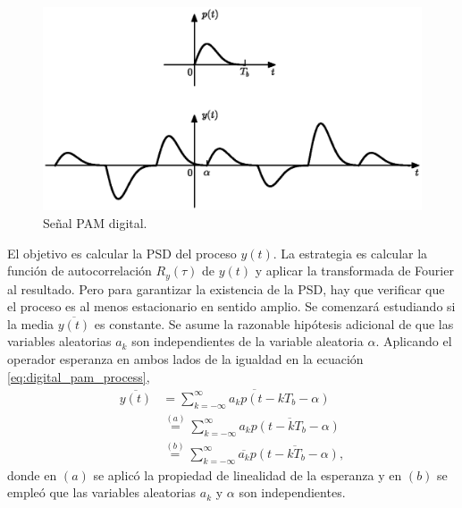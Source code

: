\documentclass[a4paper]{article}
\begin{document}
\begin{figure}[!htb]
\begin{center}
\includegraphics[width=0.9\columnwidth]{figuras/digital_pam.eps}
\caption{\label{fig:digital_pam} Señal PAM digital.}
\end{center}
\end{figure}

El objetivo es calcular la PSD  del proceso \(y(t)\). La estrategia es calcular la función de autocorrelación \(R_y(\tau)\) de \(y(t)\) y aplicar la transformada de Fourier al resultado. Pero para  garantizar la existencia de la PSD, hay que verificar que el proceso es al menos estacionario en sentido amplio. Se comenzará estudiando si la media \(\overline{y(t)}\) es constante. Se asume la razonable hipótesis adicional de que las variables aleatorias \(a_k\) son independientes de la variable aleatoria \(\alpha\). Aplicando el operador esperanza en ambos lados de la igualdad en la ecuación \ref{eq:digital_pam_process},
\begin{align*}
 \overline{y(t)} &=  \overline{\sum_{k=-\infty}^{\infty}a_kp(t-kT_b-\alpha)}\\
   &\overset{(a)}{=}\sum_{k=-\infty}^{\infty}\overline{a_kp(t-kT_b-\alpha)}\\
   &\overset{(b)}{=}\sum_{k=-\infty}^{\infty}\overline{a_k}\overline{p(t-kT_b-\alpha)},
\end{align*}
donde en \((a)\) se aplicó la propiedad de linealidad de la esperanza y en \((b)\) se empleó que las variables aleatorias \(a_k\) y \(\alpha\) son independientes.
\end{document}
